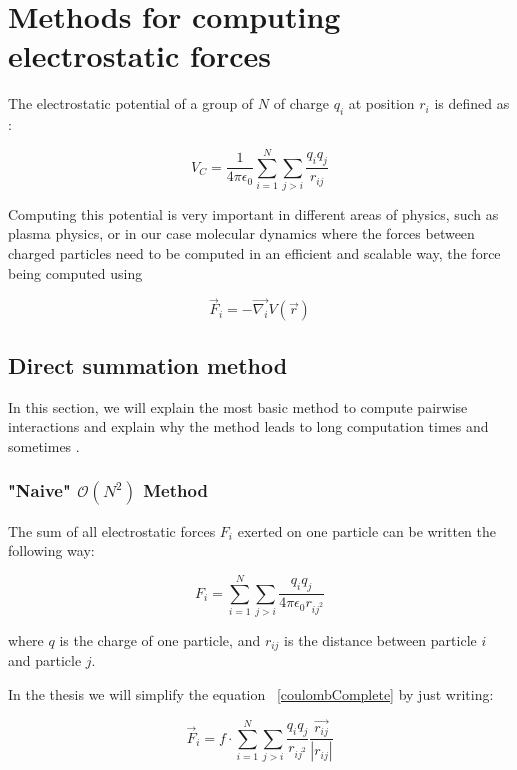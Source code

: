 \documentclass[11pt,twoside,a4paper]{report}
\begin{document}
\chapter{Methods for computing electrostatic forces}

The electrostatic potential of a group of $N$ of charge $q_i$ at position $r_i$ is defined as :

\begin{equation}
V_C = \frac{1}{4\pi\epsilon_0} \sum\limits_{i=1}^{N}\sum\limits_{j>i} \frac{q_i q_j}{r_{ij}}
\end{equation}

Computing this potential is very important in different areas of physics, such as plasma physics, or in our case molecular dynamics where the forces between charged particles need to be computed in an efficient and scalable way, the force being computed using

\begin{equation}
	\vec{F}_i = - \vec{\nabla_i} V(\vec{r})
\end{equation}


\section{Direct summation method }


In this section, we will explain the most basic method to compute pairwise interactions and explain why the method leads to long computation times and sometimes .

\subsection{"Naive" $\mathcal{O}(N^2)$ Method}

The sum of all electrostatic forces $F_i$ exerted  on one particle can be written the following way:

\begin{equation}
	F_i =  \sum\limits_{i=1}^{N}\sum\limits_{j>i} \frac{q_i q_j}{4\pi\epsilon_0 r_{ij^2}}
	\label{coulombComplete}
\end{equation}

where $q$ is the charge of one particle, and $r_{ij}$ is the distance between particle $i$ and particle $j$.

In the thesis we will simplify the equation ~\eqref{coulombComplete} by just writing:

\begin{equation}
	\vec{F}_i =  f\cdot\sum\limits_{i=1}^{N}\sum\limits_{j>i} \frac{q_i q_j}{r_{ij^2}} \frac{\vec{r_{ij}}}{|r_{ij}|}
	\label{coulombSimplified}
\end{equation}
\end{document}
